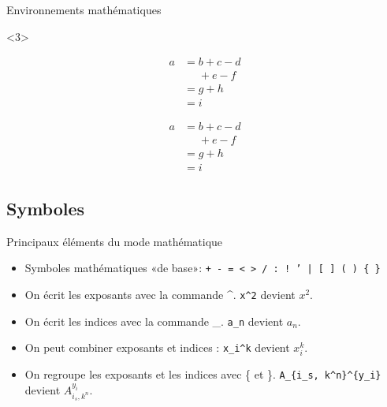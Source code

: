 \begin{frame}[fragile]{Environnements mathématiques}
	\begin{onlyenv}
\begin{codesource}
	\begin{equation}
		\begin{split}
			a &= b + c - d \\
			&\phantom{=} + e - f \\
			&= g + h \\
			&= i
		\end{split}
	\end{equation}
\end{codesource}
		\begin{equation}
			\begin{split}
				a &= b + c - d \\
				&\phantom{=} + e - f \\
				&= g + h \\
				&= i
			\end{split}
		\end{equation}
	\end{onlyenv}
\end{frame}

\subsection{Symboles}

\begin{frame}[fragile,c]{Principaux éléments du mode mathématique}
	\begin{itemize}
		\item Symboles mathématiques «de base»:
		 	\texttt{+ - = < > / : ! ' | [ ] ( ) \{ \}}
		\item On écrit les exposants avec la commande \textasciicircum. \lstinline|x^2| devient $x^2$.
		\item On écrit les indices avec la commande \_. \lstinline|a_n| devient $a_n$.
		\item On peut combiner exposants et indices : \lstinline|x_i^k| devient $x_i^k$.
		\item On regroupe les exposants et les indices avec \{ et \}. \lstinline|A_{i_s, k^n}^{y_i}|
			devient $A_{i_s, k^n}^{y_i}$.
	\end{itemize}
\end{frame}

